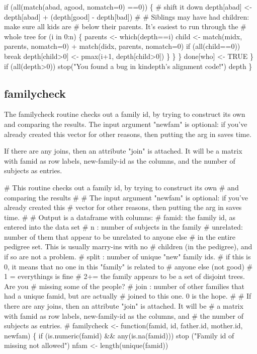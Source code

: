 \documentclass{article}
\begin{document}
\begin{enumerate}
            if (all(match(abad, agood, nomatch=0) ==0)) \{
                # shift it down
                depth[abad] <- depth[abad] + (depth[good] - depth[bad])
                #
                # Siblings may have had children: make sure all kids are
                #   below their parents.  It's easiest to run through the
                #   whole tree
                for (i in 0:n) \{
                    parents <- which(depth==i)
                    child <- match(midx, parents, nomatch=0) +
                             match(didx, parents, nomatch=0)
                    if (all(child==0)) break
                    depth[child>0] <- pmax(i+1, depth[child>0])
                    \}
                \}
            \}
        done[who] <- TRUE
        \}
    if (all(depth>0)) stop("You found a bug in kindepth's alignment code!")
    depth
    \}
\nwendcode{}\nwdocspar

\subsection{familycheck}
The familycheck routine checks out a family id, by trying to construct its own
and comparing the results.
The input argument "newfam" is optional: if you've already created this
vector for other reasons, then putting the arg in saves time.


  If there are any joins, then an attribute "join" is attached.  It will be
   a matrix with famid as row labels, new-family-id as the columns, and
   the number of subjects as entries.  

\nwenddocs{}\endmoddef
# This routine checks out a family id, by trying to construct its own
#  and comparing the results
#
# The input argument "newfam" is optional: if you've already created this
#   vector for other reasons, then putting the arg in saves time.
#
# Output is a dataframe with columns:
#   famid: the family id, as entered into the data set
#   n    : number of subjects in the family
#   unrelated: number of them that appear to be unrelated to anyone else 
#          in the entire pedigree set.  This is usually marry-ins with no 
#          children (in the pedigree), and if so are not a problem.
#   split : number of unique "new" family ids.
#            if this is 0, it means that no one in this "family" is related to
#                   anyone else (not good)
#            1 = everythings is fine
#            2+= the family appears to be a set of disjoint trees.  Are you
#                 missing some of the people?
#   join : number of other families that had a unique famid, but are actually
#            joined to this one.  0 is the hope.
#
#  If there are any joins, then an attribute "join" is attached.  It will be
#   a matrix with famid as row labels, new-family-id as the columns, and
#   the number of subjects as entries.  
#
familycheck <- function(famid, id, father.id, mother.id, newfam) \{
    if (is.numeric(famid) && any(is.na(famid)))
        stop ("Family id of missing not allowed")
    nfam <- length(unique(famid))


\end{enumerate}
\end{document}
